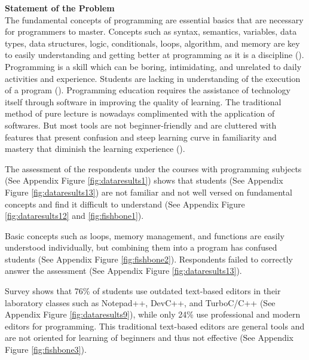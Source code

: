 \flushleft
\textbf{Statement of the Problem}\\

\justifying
\parx
The fundamental concepts of programming are essential basics that are necessary
for programmers to master. Concepts such as syntax, semantics, variables, data
types, data structures, logic, conditionals, loops, algorithm, and memory are
key to easily understanding and getting better at programming as it is a
discipline (\cite{prahofer_hurnaus_wirth_mossenbock_2007}).
Programming is a skill which can be boring, intimidating, and unrelated to daily
activities and experience. Students are lacking in understanding of the
execution of a program (\cite{tan_2019}).
Programming education requires the assistance of technology itself through
software in improving the quality of learning. The traditional method of pure
lecture is nowadays complimented with the application of softwares. But most
tools are not beginner-friendly and are cluttered with features that present
confusion and steep learning curve in familiarity and mastery that diminish the
learning experience (\cite{tsukamoto_2016}).

\justifying
\parx
The assessment of the respondents under the courses with programming subjects
(See Appendix Figure \ref{fig:dataresults1}) shows that students (See Appendix
Figure \ref{fig:dataresults13})
are not familiar and not well versed on fundamental concepts and find it
difficult to understand
(See Appendix Figure \ref{fig:dataresults12} and \ref{fig:fishbone1}).

\parx
Basic concepts such as loops, memory management, and functions are easily
understood individually, but combining them into a program has confused students
(See Appendix Figure \ref{fig:fishbone2}). Respondents failed to correctly
answer the assessment (See Appendix Figure \ref{fig:dataresults13}).

\parx
Survey shows that 76\% of students use outdated text-based editors in their
laboratory classes such as Notepad++, DevC++, and TurboC/C++ (See
Appendix Figure \ref{fig:dataresults9}), while only 24\% use professional and modern editors
for programming. This traditional text-based editors are general tools and are
not oriented for learning of beginners and thus not effective (See Appendix
Figure \ref{fig:fishbone3}).
